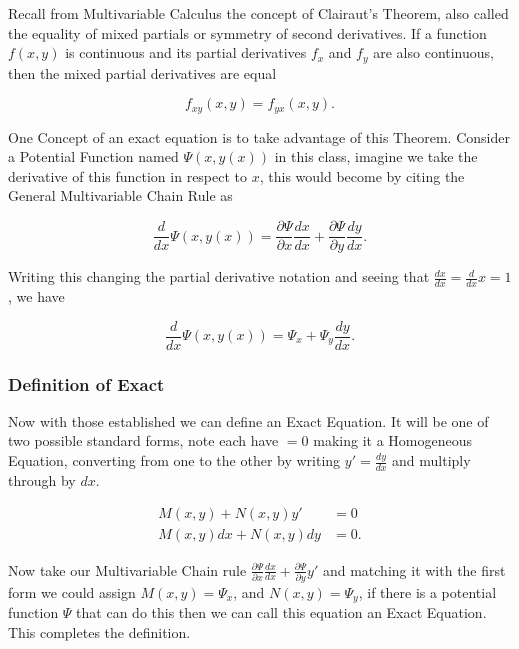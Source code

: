 \documentclass[12pt]{article}
\begin{document}
Recall from Multivariable Calculus the concept of Clairaut's Theorem, also called the equality of mixed partials or symmetry of second derivatives. If a function $f(x,y)$ is continuous and its partial derivatives $f_x$ and $f_y$ are also continuous, then the mixed partial derivatives are equal

\begin{equation*}
    f_{xy}(x,y)=f_{yx}(x,y).
\end{equation*}

One Concept of an exact equation is to take advantage of this Theorem. Consider a Potential Function named $\Psi(x,y(x))$ in this class, imagine we take the derivative of this function in respect to $x$, this would become by citing the General Multivariable Chain Rule as

\begin{equation*}
    \frac{d}{dx}\Psi(x,y(x)) = \frac{\partial \Psi}{\partial x}\frac{dx}{dx}+\frac{\partial \Psi}{\partial y}\frac{dy}{dx}.
\end{equation*}

Writing this changing the partial derivative notation and seeing that $\frac{dx}{dx}=\frac{d}{dx}x=1$, we have

\begin{equation*}
    \frac{d}{dx}\Psi(x,y(x)) = \Psi_x+\Psi_y \frac{dy}{dx}.
\end{equation*}

\pagebreak

\subsubsection{Definition of Exact}

Now with those established we can define an Exact Equation. It will be one of two possible standard forms, note each have $=0$ making it a Homogeneous Equation, converting from one to the other by writing $y'=\frac{dy}{dx}$ and multiply through by $dx$.

\begin{align*}
    M(x,y)+N(x,y)y' &= 0 \\
    M(x,y)dx+N(x,y)dy &= 0.
\end{align*}

Now take our Multivariable Chain rule $\frac{\partial \Psi}{\partial x}\frac{dx}{dx}+\frac{\partial \Psi}{\partial y}y'$ and matching it with the first form we could assign $M(x,y) = \Psi_x$, and $N(x,y) = \Psi_y$, if there is a potential function $\Psi$ that can do this then we can call this equation an Exact Equation. This completes the definition. \\
\end{document}
